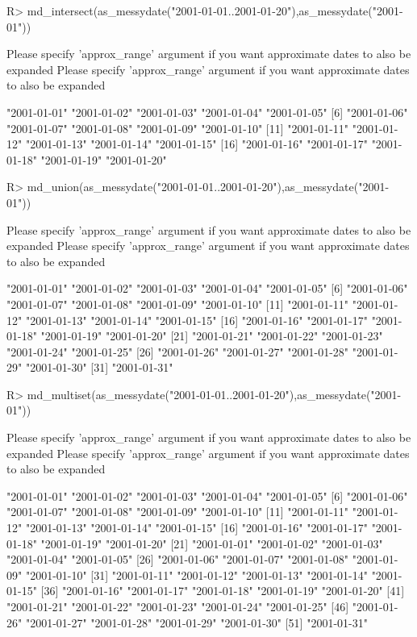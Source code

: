 \documentclass[
]{jss}
\begin{document}
\begin{CodeChunk}
\begin{CodeInput}
R> md_intersect(as_messydate("2001-01-01..2001-01-20"),as_messydate("2001-01"))
\end{CodeInput}
\begin{CodeOutput}
Please specify 'approx_range' argument if you want approximate dates to also be expanded
Please specify 'approx_range' argument if you want approximate dates to also be expanded
\end{CodeOutput}
\begin{CodeOutput}
 [1] "2001-01-01" "2001-01-02" "2001-01-03" "2001-01-04" "2001-01-05"
 [6] "2001-01-06" "2001-01-07" "2001-01-08" "2001-01-09" "2001-01-10"
[11] "2001-01-11" "2001-01-12" "2001-01-13" "2001-01-14" "2001-01-15"
[16] "2001-01-16" "2001-01-17" "2001-01-18" "2001-01-19" "2001-01-20"
\end{CodeOutput}
\begin{CodeInput}
R> md_union(as_messydate("2001-01-01..2001-01-20"),as_messydate("2001-01"))
\end{CodeInput}
\begin{CodeOutput}
Please specify 'approx_range' argument if you want approximate dates to also be expanded
Please specify 'approx_range' argument if you want approximate dates to also be expanded
\end{CodeOutput}
\begin{CodeOutput}
 [1] "2001-01-01" "2001-01-02" "2001-01-03" "2001-01-04" "2001-01-05"
 [6] "2001-01-06" "2001-01-07" "2001-01-08" "2001-01-09" "2001-01-10"
[11] "2001-01-11" "2001-01-12" "2001-01-13" "2001-01-14" "2001-01-15"
[16] "2001-01-16" "2001-01-17" "2001-01-18" "2001-01-19" "2001-01-20"
[21] "2001-01-21" "2001-01-22" "2001-01-23" "2001-01-24" "2001-01-25"
[26] "2001-01-26" "2001-01-27" "2001-01-28" "2001-01-29" "2001-01-30"
[31] "2001-01-31"
\end{CodeOutput}
\begin{CodeInput}
R> md_multiset(as_messydate("2001-01-01..2001-01-20"),as_messydate("2001-01"))
\end{CodeInput}
\begin{CodeOutput}
Please specify 'approx_range' argument if you want approximate dates to also be expanded
Please specify 'approx_range' argument if you want approximate dates to also be expanded
\end{CodeOutput}
\begin{CodeOutput}
 [1] "2001-01-01" "2001-01-02" "2001-01-03" "2001-01-04" "2001-01-05"
 [6] "2001-01-06" "2001-01-07" "2001-01-08" "2001-01-09" "2001-01-10"
[11] "2001-01-11" "2001-01-12" "2001-01-13" "2001-01-14" "2001-01-15"
[16] "2001-01-16" "2001-01-17" "2001-01-18" "2001-01-19" "2001-01-20"
[21] "2001-01-01" "2001-01-02" "2001-01-03" "2001-01-04" "2001-01-05"
[26] "2001-01-06" "2001-01-07" "2001-01-08" "2001-01-09" "2001-01-10"
[31] "2001-01-11" "2001-01-12" "2001-01-13" "2001-01-14" "2001-01-15"
[36] "2001-01-16" "2001-01-17" "2001-01-18" "2001-01-19" "2001-01-20"
[41] "2001-01-21" "2001-01-22" "2001-01-23" "2001-01-24" "2001-01-25"
[46] "2001-01-26" "2001-01-27" "2001-01-28" "2001-01-29" "2001-01-30"
[51] "2001-01-31"
\end{CodeOutput}
\end{CodeChunk}
\end{document}
